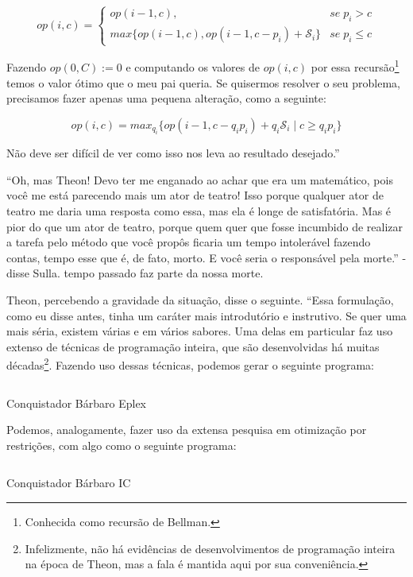 \[
op(i,c) =
\begin{cases}
  op(i-1, c), & se\; p_i > c\\ max\{op(i-1, c), op(i-1, c-p_i) +
  \mathscr{S}_i\} & se\; p_i \leq c
\end{cases}
\]

Fazendo $op(0, C) := 0$ e computando os valores de $op(i, c)$ por essa
recursão\footnote{Conhecida como recursão de Bellman.} temos o valor
ótimo que o meu pai queria. Se quisermos resolver o seu problema,
precisamos fazer apenas uma pequena alteração, como a seguinte:

\[
op(i,c) = max_{q_i}\{op(i-1, c-q_i p_i) + q_i \mathscr{S}_i\; |\; c
\geq q_i p_i\}
\]

Não deve ser difícil de ver como isso nos leva ao resultado
desejado.''

``Oh, mas Theon! Devo ter me enganado ao achar que era um matemático,
pois você me está parecendo mais um ator de teatro! Isso porque
qualquer ator de teatro me daria uma resposta como essa, mas ela é
longe de satisfatória. Mas é pior do que um ator de teatro, porque
quem quer que fosse incumbido de realizar a tarefa pelo método que
você propôs ficaria um tempo intolerável fazendo contas, tempo esse
que é, de fato, morto.  E você seria o responsável pela morte.'' -
disse Sulla.  %
tempo passado faz parte da nossa morte.

Theon, percebendo a gravidade da situação, disse o seguinte. ``Essa
formulação, como eu disse antes, tinha um caráter mais introdutório
e instrutivo. Se quer uma mais séria, existem várias e em vários
sabores. Uma delas em particular faz uso extenso de técnicas de
programação inteira, que são desenvolvidas há muitas
décadas\footnote{Infelizmente, não há evidências de desenvolvimentos
  de programação inteira na época de Theon, mas a fala é mantida
  aqui por sua conveniência.}. Fazendo uso dessas técnicas, podemos
gerar o seguinte programa:

\begin{listing}
  \inputminted{prolog}{../Exemplos/Cap12/prog1-knapSackEplex.ecl}
  \caption{Conquistador Bárbaro Eplex}\label{lst:knapsackEplex}
\end{listing}

Podemos, analogamente, fazer uso da extensa pesquisa em otimização
por restrições, com algo como o seguinte programa:

\begin{listing}[H]
  \inputminted{prolog}{../Exemplos/Cap12/prog2-knapSackIc.ecl}
  \caption{Conquistador Bárbaro IC}\label{lst:knapsackIC}
\end{listing}

